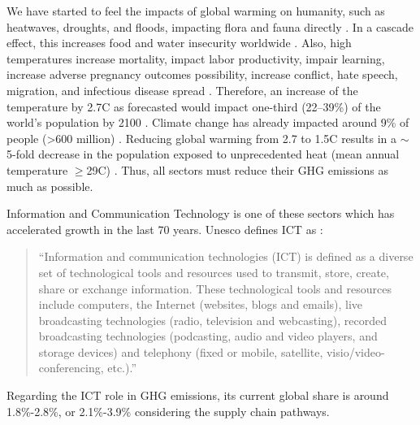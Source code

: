 We have started to feel the impacts of global warming on humanity, such as heatwaves, droughts, and floods, impacting flora and fauna directly \cite{masson2018global, change2022threat}. In a cascade effect, this increases food and water insecurity worldwide \cite{change2022threat, doi:10.1126/science.1239402}. Also, high temperatures increase mortality, impact labor productivity, impair learning, increase adverse pregnancy outcomes possibility, increase conflict, hate speech, migration, and infectious disease spread \cite{lenton2023quantifying}. Therefore, an increase of the temperature by 2.7\degree C as forecasted would impact one-third (22–39\%) of the world's population by 2100 \cite{lenton2023quantifying}. Climate change has already impacted around 9\% of people (>600 million) \cite{lenton2023quantifying}. Reducing global warming from 2.7 to 1.5\degree C results in a $\sim$5-fold decrease in the population exposed to unprecedented heat (mean annual temperature $\geq$29\degree C) \cite{lenton2023quantifying}. Thus, all sectors must reduce their GHG emissions as much as possible.

Information and Communication Technology is one of these sectors which has accelerated growth in the last 70 years. Unesco defines ICT as \cite{unesco2009guide}:

\begin{quote}
    ``Information and communication technologies (ICT) is defined as a diverse set of technological tools and resources used to transmit, store, create, share or exchange information. These technological tools and resources include computers, the Internet (websites, blogs and emails), live broadcasting technologies (radio, television and webcasting), recorded broadcasting technologies (podcasting, audio and video players, and storage devices) and telephony (fixed or mobile, satellite, visio/video-conferencing, etc.).''
\end{quote}

Regarding the ICT role in GHG emissions, its current global share is around 1.8\%-2.8\%, or 2.1\%-3.9\% considering the supply chain pathways.


